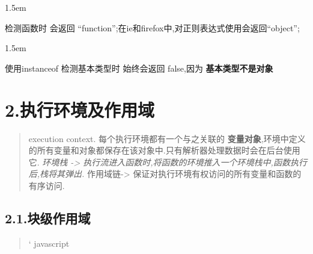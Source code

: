 \documentclass{article}
\begin{document}
\begin{mddefinitions}%


\begin{mdbmarginx}{}{}{}{1.5em}%
\begin{mddefdata}%
检测函数时 会返回 \textquotedblleft{}function\textquotedblright{};在ie和firefox中,对正则表达式使用会返回\textquotedblleft{}object\textquotedblright{};
\end{mddefdata}%
\end{mdbmarginx}%


\begin{mdbmarginx}{}{}{}{1.5em}%
\begin{mddefdata}%
使用instanceof 检测基本类型时 始终会返回 false,因为 \textbf{基本类型不是对象}%
\end{mddefdata}%
\end{mdbmarginx}%
\end{mddefinitions}%

\section{2.\hspace*{0.5em}执行环境及作用域}\label{section}%

\begin{quote}%

\noindent execution context. 每个执行环境都有一个与之关联的 \textbf{变量对象},环境中定义的所有变量和对象都保存在该对象中.只有解析器处理数据时会在后台使用它.
\emph{ 环境栈 -\textgreater{} 执行流进入函数时,将函数的环境推入一个环境栈中,函数执行后,栈将其弹出.
} 作用域链-\textgreater{} 保证对执行环境有权访问的所有变量和函数的有序访问.%
\end{quote}%

\subsection{2.1.\hspace*{0.5em}块级作用域}\label{section}%

\begin{quote}%


\mdcode{}` javascript%
\end{quote}%
\end{document}
